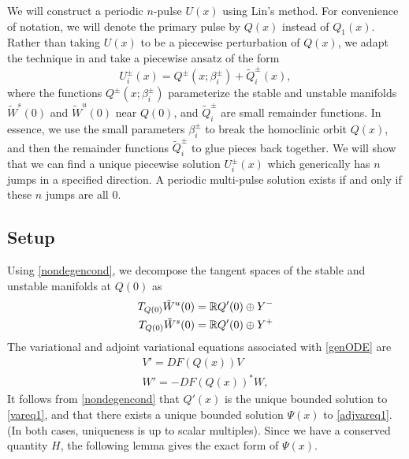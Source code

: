 \documentclass[10pt,reqno]{amsart}
\theoremstyle{plain}
\theoremstyle{definition}
\theoremstyle{remark}
\numberwithin{theorem}{section}
\numberwithin{equation}{section}
\begin{document}
We will construct a periodic $n$-pulse $U(x)$ using Lin's method. For convenience of notation, we will denote the primary pulse by $Q(x)$ instead of $Q_1(x)$. Rather than taking $U(x)$ to be a piecewise perturbation of $Q(x)$, we adapt the technique in \cite{Sandstede1997} and take a piecewise ansatz of the form
\[
U_i^\pm(x) = Q^\pm(x; \beta_i^\pm) + \tilde{Q}_i^\pm(x),
\]
where the functions $Q^\pm(x; \beta_i^\pm)$ parameterize the stable and unstable manifolds $\tilde{W}^s(0)$ and $\tilde{W}^u(0)$ near $Q(0)$, and $\tilde{Q}_i^\pm$ are small remainder functions. In essence, we use the small parameters $\beta_i^\pm$ to break the homoclinic orbit $Q(x)$, and then the remainder functions $\tilde{Q}_i^\pm$ to glue pieces back together. We will show that we can find a unique piecewise solution $U_i^\pm(x)$ which generically has $n$ jumps in a specified direction. A periodic multi-pulse solution exists if and only if these $n$ jumps are all 0.

\subsection{Setup}

Using \cref{nondegencond}, we decompose the tangent spaces of the stable and unstable manifolds at $Q(0)$ as 
\begin{equation*}
\begin{aligned}
T_{Q(0)}\tilde{W}^u(0) &= \mathbb{R} Q'(0) \oplus Y^- \\
T_{Q(0)}\tilde{W}^s(0) &= \mathbb{R} Q'(0) \oplus Y^+
\end{aligned}
\end{equation*}
The variational and adjoint variational equations associated with \cref{genODE} are
\begin{align}
V' = DF(Q(x)) V \label{vareq1} \\
W' = -DF(Q(x))^* W \label{adjvareq1},
\end{align}
It follows from \cref{nondegencond} that $Q'(x)$ is the unique bounded solution to \cref{vareq1}, and that there exists a unique bounded solution $\Psi(x)$ to \cref{adjvareq1}. (In both cases, uniqueness is up to scalar multiples). Since we have a conserved quantity $H$, the following lemma gives the exact form of $\Psi(x)$.
\end{document}
